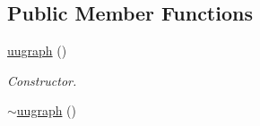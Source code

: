 \subsection*{Public Member Functions}
\begin{DoxyCompactItemize}
\item 
\hyperlink{classlgraph_1_1utils_1_1uugraph_a8b92ac8dccde231b9d35fbe20be8d1ed}{uugraph} ()\hypertarget{classlgraph_1_1utils_1_1uugraph_a8b92ac8dccde231b9d35fbe20be8d1ed}{}\label{classlgraph_1_1utils_1_1uugraph_a8b92ac8dccde231b9d35fbe20be8d1ed}

\begin{DoxyCompactList}\small\item\em Constructor. \end{DoxyCompactList}\item 
\hyperlink{classlgraph_1_1utils_1_1uugraph_a7c990a2d79beea5f05bb9d4c13071cf6}{$\sim$uugraph} ()\hypertarget{classlgraph_1_1utils_1_1uugraph_a7c990a2d79beea5f05bb9d4c13071cf6}{}\label{classlgraph_1_1utils_1_1uugraph_a7c990a2d79beea5f05bb9d4c13071cf6}


\end{DoxyCompactItemize}
